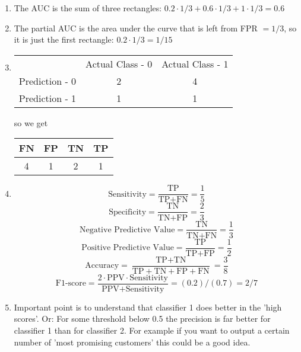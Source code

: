 \documentclass[a4paper]{article}
\newcounter{aufg}
\begin{document}
{{\begin{enumerate}
  \item The AUC is the sum of three rectangles: $0.2 \cdot 1/3 + 0.6 \cdot 1/3 + 
  1\cdot 1/3 = 0.6$
  
  \item The partial AUC is the area under the curve that is left from 
  FPR $= 1/3$, so it is just the first rectangle: $0.2 \cdot 1/3 = 1/15$
  
  \item \phantom{foo}
  \begin{tabular}{ | c | c | c | } \hline
    & Actual Class - 0 & Actual Class - 1  \\
    Prediction - 0 & 2 & 4  \\
    Prediction - 1 & 1 & 1  \\ \hline
  \end{tabular}
  so we get
  \begin{tabular}{ | c | c | c | c | }
    \hline
    FN & FP & TN & TP   \\ \hline
    4 & 1 & 2 & 1 \\ \hline
  \end{tabular}
    
  \item $$\text{Sensitivity} = \frac{\text{TP}}{\text{TP} + \text{FN}} =
  \frac{1}{5} $$
  $$\text{Specificity}  = \frac{\text{TN}}{\text{TN} + \text{FP}} =\frac{2}{3}$$
  $$\text{Negative Predictive Value} = \frac{\text{TN}}{\text{TN} + \text{FN}} =
  \frac{1}{3} $$
  $$\text{Positive Predictive Value} = \frac{\text{TP}}{\text{TP} + \text{FP}} =
  \frac{1}{2} $$
  $$\text{Accuracy} = \frac{\text{TP} + \text{TN}}{\text{TP} + \text{TN} + 
  \text{FP} + \text{FN}} =\frac{3}{8} $$
  $$\text{F1-score} = \frac{2\cdot\text{PPV}\cdot\text{Sensitivity}}{\text{PPV}
  +\text{Sensitivity}} = (0.2) / (0.7) = 2/7  $$
  
  \item Important point is to understand that classifier 1 does better in the
  'high scores'. Or: For some threshold below 0.5 the precision is far better
  for classifier 1 than for classifier 2. For example if you want to output a
  certain number of 'most promising customers' this could be a good idea.

\end{enumerate}
}


\dlz
{}}
\end{document}
